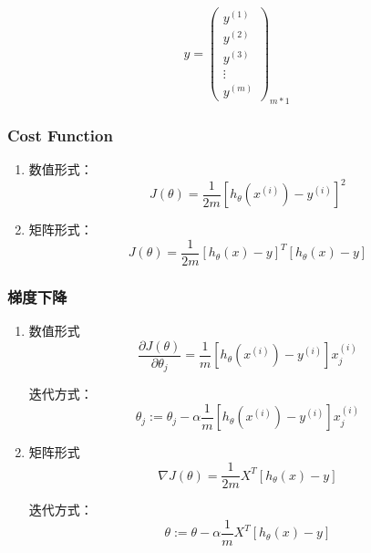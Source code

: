 \begin{equation}
	y = \left(\begin{matrix}
		y^{(1)} \\ y^{(2)} \\ y^{(3)} \\ \vdots \\ y^{(m)}
	\end{matrix}\right)_{m*1}
\end{equation}


\subsubsection{Cost Function}
\begin{enumerate}
\item 数值形式：
\begin{equation}
	J(\theta) = \frac{1}{2m} \left[ h_\theta(x^{(i)}) - y^{(i)}\right]^2
\end{equation}

\item 矩阵形式：
\begin{equation}
	J(\theta) = \frac{1}{2m} \left[h_\theta(x) - y\right]^T \left[ h_\theta(x) - y\right]
\end{equation}
\end{enumerate}

\subsubsection{梯度下降}
\begin{enumerate}
\item 数值形式
\begin{equation}
	\frac{\partial J(\theta)}{\partial \theta_j} =
	    \frac{1}{m} \left[ h_\theta(x^{(i)}) - y^{(i)} \right] x_j^{(i)}
\end{equation}

迭代方式：
\begin{equation}
	\theta_j := \theta_j - \alpha \frac{1}{m} \left[h_\theta(x^{(i)}) - y^{(i)}\right] x_j^{(i)}
\end{equation}

\item 矩阵形式
\begin{equation}
	\nabla J(\theta) = \frac{1}{2m} X^T \left[h_\theta(x) - y\right]
\end{equation}

迭代方式：
\begin{equation}
	\theta := \theta - \alpha \frac{1}{m} X^T \left[ h_\theta(x) - y\right]
\end{equation}
\end{enumerate}



